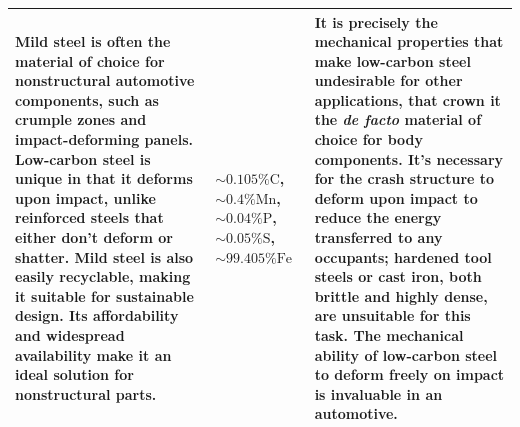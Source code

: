\documentclass[../main.tex]{subfiles}
\begin{document}
\begin{table}[h!]
\begin{center}
\begin{tabularx}{\textwidth}{
				| >{\RaggedRight\arraybackslash}X
				| >{\Centering\arraybackslash}X
				| >{\RaggedRight\arraybackslash}X |}
			\hline
			Mild steel is often the material of choice for nonstructural automotive components, such as crumple zones and impact-deforming panels. Low-carbon steel is unique in that it deforms upon impact, unlike reinforced steels that either don't deform or shatter. Mild steel is also easily recyclable, making it suitable for sustainable design. Its affordability and widespread availability make it an ideal solution for nonstructural parts. &
			$\sim0.105\%\mathrm{C}$, \hskip 3cm $\sim0.4\%\mathrm{Mn}$, $\sim0.04\%\mathrm{P}$, $\sim0.05\%\mathrm{S}$, $\sim99.405\%\mathrm{Fe}$ \parencite{mildsteelcompprop}                                                                                                                                                                                                                                                                               &
			It is precisely the mechanical properties that make low-carbon steel undesirable for other applications, that crown it the \textit{de facto} material of choice for body components. It's necessary for the crash structure to deform upon impact to reduce the energy transferred to any occupants; hardened tool steels or cast iron, both brittle and highly dense, are unsuitable for this task. The mechanical ability of low-carbon steel to deform freely on impact is invaluable in an automotive. \parencite{mildsteelappprop} \\
			\hline
		\end{tabularx}
	\end{center}
\end{table}
\newpage
\end{document}
